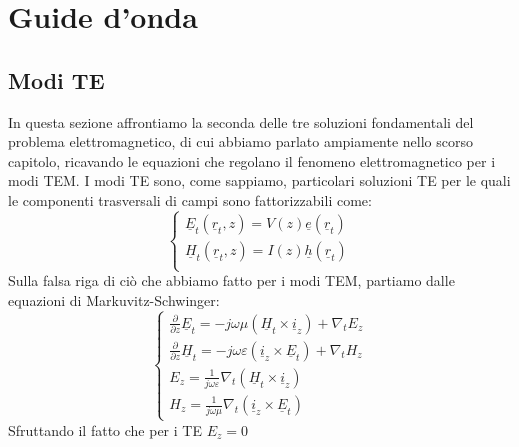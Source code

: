 \documentclass{book}
\begin{document}
        \chapter{Guide d'onda}
            \section{Modi TE}
                In questa sezione affrontiamo la seconda delle tre soluzioni fondamentali del problema elettromagnetico, 
                di cui abbiamo parlato ampiamente nello scorso capitolo, ricavando le equazioni che regolano il fenomeno elettromagnetico 
                per i modi TEM. I modi TE sono, come sappiamo, particolari soluzioni TE per le quali le componenti trasversali di campi sono 
                fattorizzabili come:
                \begin{equation}
                    \label{eqn:soluzioni_TE}
                    \begin{cases}
                        \underline{E}_{t}(\underline{r}_{t},z) = V(z)\underline{e}(\underline{r}_{t}) \\
                        \underline{H}_{t}(\underline{r}_{t},z) = I(z)\underline{h}(\underline{r}_{t}) \\
                    \end{cases}
                \end{equation}
            Sulla falsa riga di ciò che abbiamo fatto per i modi TEM, partiamo dalle equazioni di Markuvitz-Schwinger:
            \begin{equation}
                \begin{cases}
                    \displaystyle \frac{\partial}{\partial z} \underline{E}_{t} = -j \omega \mu (\underline{H}_{t} \times \underline{i}_{z})+\nabla_{t} E_{z} \\
                    \displaystyle \frac{\partial}{\partial z} \underline{H}_{t} = -j \omega \varepsilon( \underline{i}_{z} \times \underline{E}_{t})+\nabla_{t}H_{z} \\
                    \displaystyle E_{z}=\frac{1}{j\omega \varepsilon}\nabla_{t}(\underline{H}_{t}\times \underline{i}_{z}) \\
                    \displaystyle H_{z} = \frac{1}{j \omega \mu} \nabla_{t}(\underline{i}_{z}\times \underline{E}_{t})    
                \end{cases}
            \end{equation}
            Sfruttando il fatto che per i TE $E_{z}=0$
\end{document}
